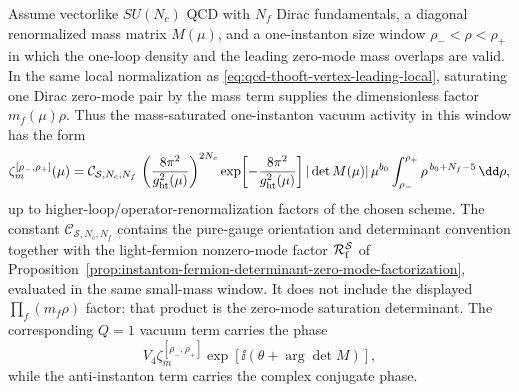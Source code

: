 \begin{controlledapproximation}
\label{ca:mass-saturated-instanton-vacuum-activity}
Assume vectorlike \(SU(N_c)\) QCD with \(N_f\) Dirac fundamentals, a diagonal
renormalized mass matrix \(M(\mu)\), and a one-instanton size window
\(\rho_-<\rho<\rho_+\) in which the one-loop density and the leading
zero-mode mass overlaps are valid.  In the same local normalization as
\eqref{eq:qcd-thooft-vertex-leading-local}, saturating one Dirac zero-mode
pair by the mass term supplies the dimensionless factor \(m_f(\mu)\rho\).
Thus the mass-saturated one-instanton vacuum activity in this window has the
form
\begin{equation}
  \zeta_m^{[\rho_-,\rho_+]}(\mu)
  =
  \mathcal C_{\mathcal S,N_c,N_f}\,
  \left(\frac{8\pi^2}{g_{\rm ht}^2(\mu)}\right)^{2N_c}
  \exp\!\left[-\frac{8\pi^2}{g_{\rm ht}^2(\mu)}\right]
  |\det M(\mu)|\,\mu^{b_0}
  \int_{\rho_-}^{\rho_+}
  \rho^{\,b_0+N_f-5}\,\dd\rho ,
  \label{eq:mass-saturated-instanton-window-activity}
\end{equation}
up to higher-loop/operator-renormalization factors of the chosen scheme.  The
constant \(\mathcal C_{\mathcal S,N_c,N_f}\) contains the pure-gauge
orientation and determinant convention together with the light-fermion
nonzero-mode factor \(\mathcal R_{\rm f}^{\mathcal S}\) of
Proposition~\ref{prop:instanton-fermion-determinant-zero-mode-factorization},
evaluated in the same small-mass window.  It does not include the displayed
\(\prod_f(m_f\rho)\) factor: that product is the zero-mode saturation
determinant.  The corresponding \(Q=1\) vacuum term carries the phase
\begin{equation}
  V_4\zeta_m^{[\rho_-,\rho_+]}
  \exp\!\left[\ii(\theta+\arg\det M)\right],
  \label{eq:mass-saturated-instanton-vacuum-phase}
\end{equation}
while the anti-instanton term carries the complex conjugate phase.


\end{controlledapproximation}
